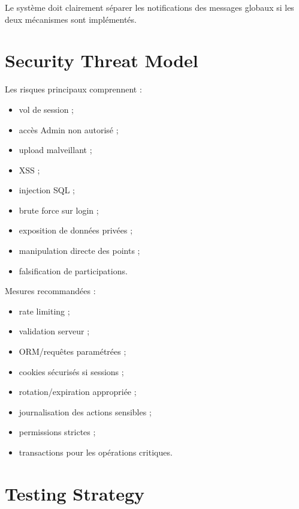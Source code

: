 \documentclass[11pt,a4paper]{report}
\begin{document}
Le système doit clairement séparer les notifications des messages globaux si les deux mécanismes sont implémentés.

\chapter{Security Threat Model}

Les risques principaux comprennent :

\begin{itemize}
    \item vol de session ;
    \item accès Admin non autorisé ;
    \item upload malveillant ;
    \item XSS ;
    \item injection SQL ;
    \item brute force sur login ;
    \item exposition de données privées ;
    \item manipulation directe des points ;
    \item falsification de participations.
\end{itemize}

Mesures recommandées :

\begin{itemize}
    \item rate limiting ;
    \item validation serveur ;
    \item ORM/requêtes paramétrées ;
    \item cookies sécurisés si sessions ;
    \item rotation/expiration appropriée ;
    \item journalisation des actions sensibles ;
    \item permissions strictes ;
    \item transactions pour les opérations critiques.
\end{itemize}

\chapter{Testing Strategy}
\end{document}
